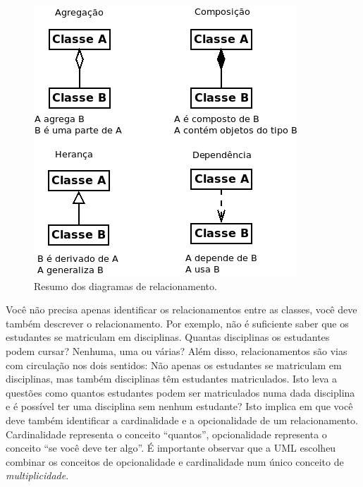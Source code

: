 \documentclass[
	11pt,				%
	openright,
	twoside,			%
	a4paper,			%
	english,			%
	french,
	brazil,				%
	sumario=tradicional
	]{abntex2}
\begin{document}
\begin{figure}[h]
\begin{center}
\includegraphics[scale=0.65]{clsRelac.png}
\end{center}
\caption{Resumo dos diagramas de relacionamento.} \label{fig:relac}
\end{figure}

Você não precisa apenas identificar os relacionamentos entre as classes, você deve também descrever o relacionamento. Por exemplo, não é suficiente saber que os estudantes se matriculam em disciplinas. Quantas disciplinas os estudantes podem cursar? Nenhuma, uma ou várias? Além disso, relacionamentos são vias com circulação nos dois sentidos: Não apenas os estudantes se matriculam em disciplinas, mas também disciplinas têm estudantes matriculados. Isto leva a questões como quantos estudantes podem ser matriculados numa dada disciplina e é possível ter uma disciplina sem nenhum estudante? Isto implica em que você deve também identificar a cardinalidade e a opcionalidade de um relacionamento. Cardinalidade representa o conceito ``quantos'', opcionalidade representa o conceito ``se você deve ter algo''. É importante observar que a UML escolheu combinar os conceitos de opcionalidade e cardinalidade num único conceito de \emph{multiplicidade}.
\end{document}

